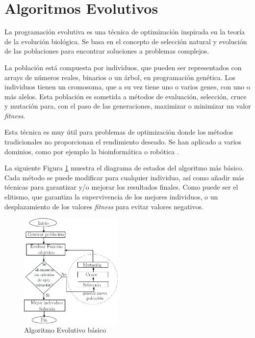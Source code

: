 \section{Algoritmos Evolutivos}


	La programación evolutiva es una técnica de optimización inspirada en la teoría de la evolución biológica. Se basa en el concepto de selección natural y evolución de las poblaciones para encontrar soluciones a problemas complejos. 
	
	La población está compuesta por individuos, que pueden ser representados con arrays de números reales, binarios o un árbol, en programación genética. Los individuos tienen un cromosoma, que a su vez tiene uno o varios genes, con uno o más alelos. Esta población es sometida a métodos de evaluación, selección, cruce y mutación para, con el paso de las generaciones, maximizar o minimizar un valor \textit{fitness}.
	
	Esta técnica es muy útil para problemas de optimización donde los métodos tradicionales no proporcionan el rendimiento deseado.  Se han aplicado a varios dominios, como por ejemplo la bioinformática o robótica \cite{contreras2015mobile}.
	
	La siguiente Figura \ref{fig:AG} muestra el diagrama de estados del algoritmo más básico. Cada método se puede modificar para cualquier individuo, así como añadir más técnicas para garantizar y/o mejorar los resultados finales. Como puede ser el elitismo, que garantiza la supervivencia de los mejores individuos, o un desplazamiento de los valores \textit{fitness} para evitar valores negativos. 


	\begin{figure}[!h]
		\centering
		\includegraphics[width=0.45\textwidth]{images/chapter_2/AG}
		\caption{Algoritmo Evolutivo básico}
		\label{fig:AG}
	\end{figure}




